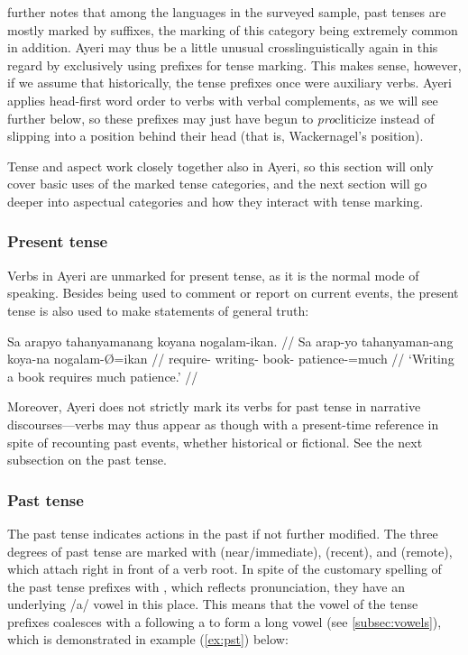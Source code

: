 \citet[117]{dahl1985} further notes that among the languages in the surveyed 
sample, past tenses are mostly marked by suffixes, the marking of this 
category being extremely common in addition. Ayeri may thus be a little unusual 
crosslinguistically again in this regard by exclusively using prefixes for 
tense marking. This makes sense, however, if we assume that historically, the 
tense prefixes once were auxiliary verbs. Ayeri applies head-first word 
order to verbs with verbal complements, as we will see further below, so these 
prefixes may just have begun to \emph{pro}cliticize instead of slipping 
into a position behind their head (that is, Wackernagel's position).

Tense and aspect work closely together also in Ayeri, so this section will only 
cover basic uses of the marked tense categories, and the next section will go 
deeper into aspectual categories and how they interact with tense marking.

\subsubsection{Present tense}
Verbs in Ayeri are unmarked for present tense, as it is the normal mode of 
speaking. Besides being used to comment or report on current events, the 
present tense is also used to make statements of general truth:

\ex\begingl
	\gla Sa arapyo tahanyamanang koyana nogalam-ikan. //
	\glb Sa arap-yo tahanyaman-ang koya-na nogalam-Ø=ikan //
	\glc \PatT{} require-\TsgN{} writing-\Aarg{} book-\Gen{} 
		patience-\Top{}=much //
	\glft `Writing a book requires much patience.' //
\endgl\xe

Moreover, Ayeri does not strictly mark its verbs for past tense in narrative 
discourses---verbs may thus appear as though with a present-time reference in 
spite of recounting past events, whether historical or fictional. See the next 
subsection on the past tense.


\subsubsection{Past tense}
The past tense indicates actions in the past if not further modified. 
The three degrees of past tense are marked with  
(near/immediate),  (recent), and  (remote), which 
attach right in front of a verb root. In spite of the customary spelling of the 
past tense prefixes with , which reflects pronunciation, they have an 
underlying /a/ vowel in this place. This means that the vowel of the tense 
prefixes coalesces with a following a to form a long vowel (see 
\autoref{subsec:vowels}), which is demonstrated in example (\ref{ex:pst}) below:

